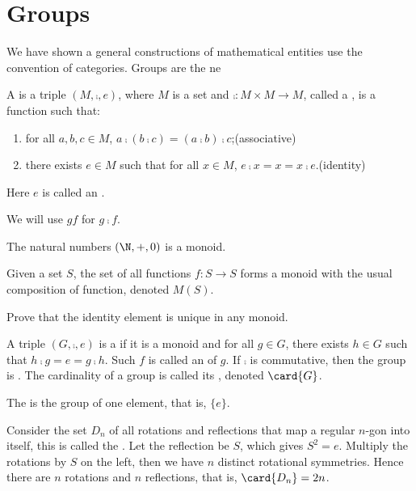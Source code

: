 \documentclass[10pt]{article}
\begin{document}
\section{Groups}
We have shown a general constructions of mathematical entities use the convention of categories. Groups are the ne
\begin{definition}
    A  is a triple $(M,\comp,e)$, where $M$ is a set and $\comp:M\times M\to M$, called a , is a function such that:
    \begin{enumerate}
        \item for all $a,b,c\in M$, $a\comp(b\comp c)=(a\comp b)\comp c$;\hfill(associative)
        \item there exists $e\in M$ such that for all $x\in M$, $e\comp x=x=x\comp e$.\hfill(identity)
    \end{enumerate}
    Here $e$ is called an .
\end{definition}
\begin{remark}
    We will use $gf$ for $g\comp f$.
\end{remark}
\begin{example}
    The natural numbers $(\N,+,0)$ is a monoid.
\end{example}
\begin{example}
    Given a set $S$, the set of all functions $f:S\to S$ forms a monoid with the usual composition of function, denoted $M(S)$.
\end{example}
\begin{problem}
    Prove that the identity element is unique in any monoid.
\end{problem}
\begin{definition}
    A triple $(G,\comp,e)$ is a  if it is a monoid and for all $g\in G$, there exists $h\in G$ such that $h\comp g=e=g\comp h$. Such $f$ is called an  of $g$. If $\comp$ is commutative, then the group is . The cardinality of a group is called its , denoted $\card{G}$.
\end{definition}
\begin{example}
    The  is the group of one element, that is, $\{e\}$.
\end{example}
\begin{example}
    Consider the set ${D}_{n}$ of all rotations and reflections that map a regular $n$-gon into itself, this is called the . Let the reflection be $S$, which gives ${S}^{2}=e$. Multiply the rotations by $S$ on the left, then we have $n$ distinct rotational symmetries. Hence there are $n$ rotations and $n$ reflections, that is, $\card{{D}_{n}}=2n$.
\end{example}
\end{document}
